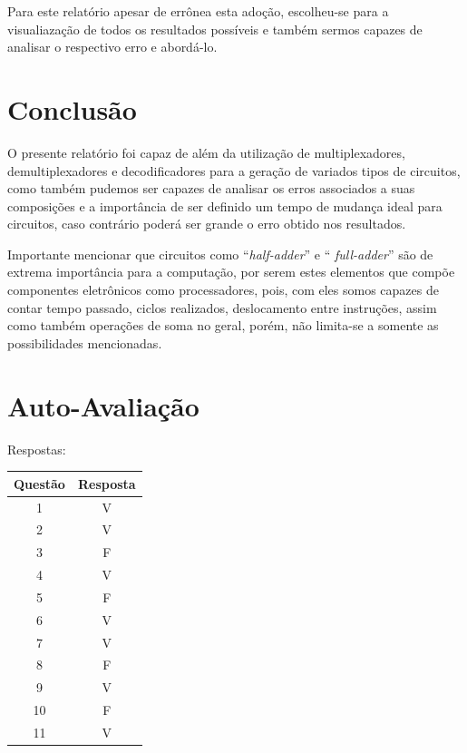 \documentclass[12pt]{article}
\begin{document}
Para este relatório apesar de errônea esta adoção, escolheu-se para a visualiazação de todos os resultados possíveis e também sermos capazes de analisar o respectivo erro e abordá-lo.

\section{Conclusão}\label{sec:Conclusao}

O presente relatório foi capaz de além da utilização de multiplexadores, demultiplexadores e decodificadores para a geração de variados tipos de circuitos, como também pudemos ser capazes de analisar os erros associados a suas composições e a importância de ser definido um tempo de mudança ideal para circuitos, caso contrário poderá ser grande o erro obtido nos resultados.

Importante mencionar que circuitos como ``\emph{half-adder}'' e `` \emph{full-adder}'' são de extrema importância para a computação, por serem estes elementos que compõe componentes eletrônicos como processadores, pois, com eles somos capazes de contar tempo passado, ciclos realizados, deslocamento entre instruções, assim como também operações de soma no geral, porém, não limita-se a somente as possibilidades mencionadas.


\nocite{*}



\newpage
\section*{Auto-Avaliação}

Respostas:

\begin{table}[H]
      \begin{tabular}{|c|c|} \hline
      \textbf{Questão} & \textbf{Resposta}\\
      \hline
      1  & V \\ \hline
      2  & V \\ \hline
      3  & F \\ \hline
      4  & V \\ \hline
      5  & F \\ \hline
      6  & V \\ \hline
      7  & V \\ \hline
      8  & F \\ \hline
      9  & V \\ \hline
      10 & F \\ \hline
      11 & V \\ \hline
      \end{tabular}
\end{table}
\end{document}
